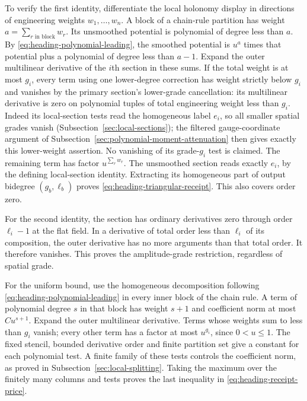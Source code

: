 To verify the first identity, differentiate the local holonomy
display in directions of engineering weights $w_1,\ldots,w_n$.
A block of a chain-rule partition has weight
$a=\sum_{r\text{ in block}}w_r$. Its unsmoothed potential is
polynomial of degree less than $a$. By
\eqref{eq:heading-polynomial-leading}, the smoothed potential is
$u^a$ times that potential plus a polynomial of degree less than
$a-1$. Expand the outer multilinear derivative of the $i$th section
in these sums. If the total weight is at most $g_i$, every term using
one lower-degree correction has weight strictly below $g_i$ and
vanishes by the primary section's lower-grade cancellation: its
multilinear derivative is zero on polynomial tuples of total
engineering weight less than $g_i$. Indeed its local-section tests
read the homogeneous label $e_i$, so all smaller spatial grades
vanish (Subsection~\ref{sec:local-sections}); the filtered
gauge-coordinate argument of
Subsection~\ref{sec:polynomial-moment-attenuation} then gives exactly
this lower-weight assertion. No vanishing of its grade-$g_i$ test
is claimed. The remaining term
has factor $u^{\sum_r w_r}$. The unsmoothed section reads exactly
$e_i$, by the defining local-section identity. Extracting its
homogeneous part of output bidegree $(g_b,\ell_b)$ proves
\eqref{eq:heading-triangular-receipt}. This also covers order zero.

For the second identity, the section has ordinary derivatives zero
through order $\ell_i-1$ at the flat field. In a derivative of total
order less than $\ell_i$ of its composition, the outer derivative
has no more arguments than that total order. It therefore vanishes.
This proves the amplitude-grade restriction, regardless of spatial
grade.

For the uniform bound, use the homogeneous decomposition following
\eqref{eq:heading-polynomial-leading} in every inner block of the
chain rule. A term of polynomial degree $s$ in that block has weight
$s+1$ and coefficient norm at most $C u^{s+1}$. Expand the outer
multilinear derivative. Terms whose weights sum to less than $g_i$
vanish; every other term has a factor at most $u^{g_i}$, since
$0<u\le1$. The fixed stencil, bounded derivative order and finite
partition set give a constant for each polynomial test. A finite
family of these tests controls the coefficient norm, as proved in
Subsection~\ref{sec:local-splitting}. Taking the maximum over the
finitely many columns and tests proves the last inequality in
\eqref{eq:heading-receipt-price}.

